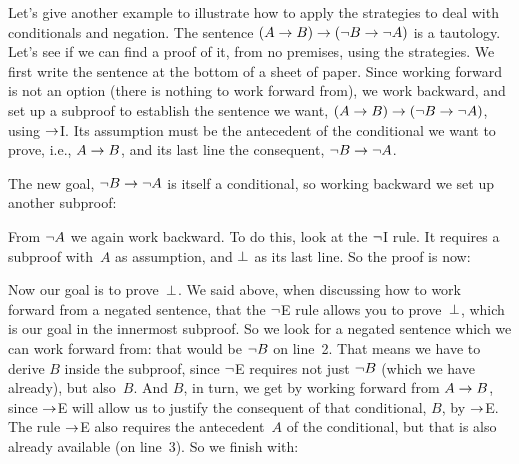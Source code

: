 Let's give another example to illustrate how to apply the strategies
to deal with conditionals and negation. The sentence $(A \rightarrow B) \rightarrow
(\neg B \rightarrow \neg A)$ is a tautology. Let's see if we can find a
proof of it, from no premises, using the strategies. We first write
the sentence at the bottom of a sheet of paper. Since working forward
is not an option (there is nothing to work forward from), we work
backward, and set up a subproof to establish the sentence we want, $(A
\rightarrow B) \rightarrow (\neg B \rightarrow \neg A)$, using $\rightarrow$I. Its assumption
must be the antecedent of the conditional we want to prove, i.e., $A
\rightarrow B$, and its last line the consequent, $\neg B \rightarrow \neg A$.
\begin{fitchproof}
\open
{}\AS
\ellipsesline
{}
\close
{}
\end{fitchproof}
The new goal, $\neg B \rightarrow \neg A$ is itself a conditional, so working backward we set up another subproof:
\begin{fitchproof}
	\open
	\AS
	\open
	\AS
	\ellipsesline
	\close
	\close
\end{fitchproof}
From $\neg A$ we again work backward. To do this, look at the $\neg$I rule. It requires a subproof with~$A$ as assumption, and $\bot$ as its last line. So the proof is now:
\begin{fitchproof}
	\open
	\AS
	\open
	\AS
	\open{}
	\ellipsesline
	\close
	\close
	\close
\end{fitchproof}
Now our goal is to prove~$\bot$. We said above, when discussing how
to work forward from a negated sentence, that the $\neg$E rule allows
you to prove~$\bot$, which is our goal in the innermost subproof. So
we look for a negated sentence which we can work forward from: that
would be $\neg B$ on line~2. That means we have to derive $B$
inside the subproof, since $\neg$E requires not just $\neg B$ (which
we have already), but also~$B$. And $B$, in turn, we get by working
forward from $A \rightarrow B$, since $\rightarrow$E will allow us to justify the
consequent of that conditional, $B$, by $\rightarrow$E. The rule $\rightarrow$E also
requires the antecedent~$A$ of the conditional, but that is also
already available (on line~3). So we finish with:
\begin{fitchproof}
	\open
	\AS
	\open
	\AS
	\open{}
	\close
	\close
	\close
\end{fitchproof}

